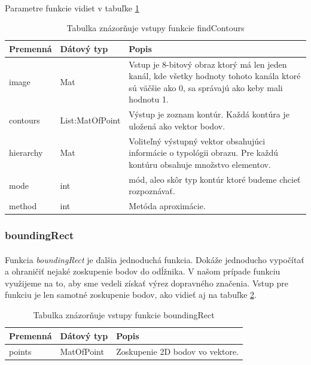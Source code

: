 \documentclass[12pt]{article}
\begin{document}
\paragraph{}
Parametre funkcie vidiet v tabuľke \ref{findContoursPar}
\begin{table}
	\centering
    \begin{tabular}{ | l | l | p{5cm} |}
    \hline
    Premenná & Dátový typ & Popis \\ \hline
    image & Mat & Vstup je 8-bitový obraz ktorý má len jeden kanál, kde všetky hodnoty tohoto kanála ktoré sú väčšie ako 0, sa správajú ako keby mali hodnotu 1. \\ \hline
    contours & List:MatOfPoint & Výstup je zoznam kontúr. Každá kontúra je uložená ako vektor bodov. \\ \hline
    hierarchy & Mat & Voliteľný výstupný vektor obsahujúci informácie o typológii obrazu. Pre každú kontúru obsahuje množstvo elementov. \\ \hline
    mode & int & mód, aleo skôr typ kontúr ktoré budeme chcieť rozpoznávať. \\ \hline
    method & int & Metóda aproximácie. \\
    \hline
    \end{tabular}
  	\caption{Tabulka znázorňuje vstupy funkcie findContours}
  	\label{findContoursPar}
\end{table}
\subsubsection{boundingRect}
\paragraph{}
Funkcia \emph{boundingRect} je ďalšia jednoduchá funkcia. Dokáže jednoducho vypočítať a ohraničiť nejaké zoskupenie bodov do odĺžnika.
V našom prípade funkciu využijeme na to, aby sme vedeli získať výrez dopravného značenia. Vstup pre funkciu je len samotné zoskupenie bodov, ako vidieť aj na tabuľke \ref{boundingRectPar}.
\cite{boundingrect_doc}
\cite{OpenCVDoc}
\begin{table}
	\centering
    \begin{tabular}{ | l | l | p{5cm} |}
    \hline
    Premenná & Dátový typ & Popis \\ \hline
    points & MatOfPoint & Zoskupenie 2D bodov vo vektore. \\ 
    \hline
    \end{tabular}
  	\caption{Tabulka znázorňuje vstupy funkcie boundingRect}
  	\label{boundingRectPar}
\end{table}
\end{document}
